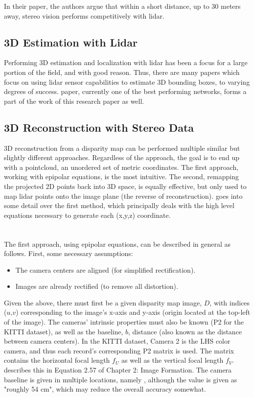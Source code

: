In their paper, the authors argue that within a short distance, up to 30 meters away, stereo vision performs competitively with lidar.

\subsection{3D Estimation with Lidar}
Performing 3D estimation and localization with lidar has been a focus for a large portion of the field, and with good reason. Thus, there are many papers which focus on using lidar sensor capabilities to estimate 3D bounding boxes, to varying degrees of success. \cite{qi_frustum_2017} paper, currently one of the best performing networks, forms a part of the work of this research paper as well.

\subsection{3D Reconstruction with Stereo Data}
\label{sect_reconstruct}
3D reconstruction from a disparity map can be performed multiple similar but slightly different approaches. Regardless of the approach, the goal is to end up with a pointcloud, an unordered set of metric coordinates. The first approach, working with epipolar equations, is the most intuitive. The second, remapping the projected 2D points back into 3D space, is equally effective, but only used to map lidar points onto the image plane (the reverse of reconstruction). \cite{szeliski_computer_2010} goes into some detail over the first method, which principally deals with the high level equations necessary to generate each (x,y,z) coordinate.
\\
\\
\\
The first approach, using epipolar equations, can be described in general as follows. First, some necessary assumptions:
\begin{itemize} \itemsep=-0.5em
    \item The camera centers are aligned (for simplified rectification).
    \item Images are already rectified (to remove all distortion).
\end{itemize}

Given the above, there must first be a given disparity map image, $D$, with indices ($u$,$v$) corresponding to the image's x-axis and y-axis (origin located at the top-left of the image). The cameras' intrinsic properties must also be known (P2 for the KITTI dataset), as well as the baseline, $b$, distance (also known as the distance between camera centers). In the KITTI dataset, Camera 2 is the LHS color camera, and thus each record's corresponding P2 matrix is used. The matrix contains the horizontal focal length $f_U$ as well as the vertical focal length $f_V$. \cite{szeliski_computer_2010} describes this in Equation 2.57 of Chapter 2: Image Formation. The camera baseline is given in multiple locations, namely \cite{geiger_are_2012}, although the value is given as "roughly 54 cm", which may reduce the overall accuracy somewhat.

